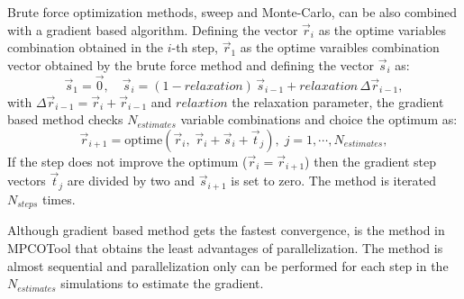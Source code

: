 \documentclass[review,authoryear]{elsarticle}
\newcommand{\EQ}[2]
{\begin{equation}#1\label{#2}\end{equation}}
\newcommand{\PA}[1]{\left(#1\right)}
\begin{document}
Brute force optimization methods, sweep and Monte-Carlo, can be also combined
with a gradient based algorithm. Defining the vector $\vec{r}_i$ as the optime
variables combination obtained in the $i$-th step, $\vec{r}_1$ as the optime
varaibles combination vector obtained by the brute force method and defining
the vector $\vec{s}_i$ as:
\EQ
{
	\vec{s}_1=\vec{0},\quad
	\vec{s}_i=(1-relaxation)\,\vec{s}_{i-1}+relaxation\,\Delta\vec{r}_{i-1},
}{Eqs}
with $\Delta\vec{r}_{i-1}=\vec{r}_i+\vec{r}_{i-1}$ and $relaxtion$ the
relaxation parameter, the gradient based method checks $N_{estimates}$ variable
combinations and choice the optimum as:
\EQ
{
	\vec{r}_{i+1}=\mathrm{optime}\PA{\vec{r}_i,\;\vec{r}_i+\vec{s}_i+\vec{t}_j},
	\;j=1,\cdots,N_{estimates},
}{EqGradient}
If the step does not improve the optimum ($\vec{r}_i=\vec{r}_{i+1}$) then the
gradient step vectors $\vec{t}_j$ are divided by two and $\vec{s}_{i+1}$ is set
to zero. The method is iterated $N_{steps}$ times.

Although gradient based method gets the fastest convergence, is the method in
MPCOTool that obtains the least advantages of parallelization. The method is
almost sequential and parallelization only can be performed for each step in
the $N_{estimates}$ simulations to estimate the gradient.
\end{document}
